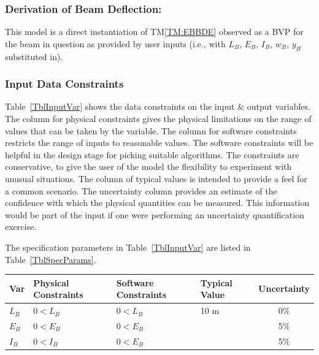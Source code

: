 \documentclass[12pt]{article}
\newcommand{\tref}[1]{TM\ref{#1}}
\begin{document}
\subsubsection*{Derivation of Beam Deflection:}

This model is a direct instantiation of \tref{TM:EBBDE} observed as a BVP for
the beam in question as provided by user inputs (i.e., with $L_B$, $E_B$, $I_B$,
$w_B$, $y_B$ substituted in).

\subsubsection{Input Data Constraints}
\label{sec_DataConstraints}

Table~\ref{TblInputVar} shows the data constraints on the input \& output
variables.  The column for physical constraints gives the physical limitations
on the range of values that can be taken by the variable.  The column for
software constraints restricts the range of inputs to reasonable values.  The
software constraints will be helpful in the design stage for picking suitable
algorithms.  The constraints are conservative, to give the user of the model the
flexibility to experiment with unusual situations.  The column of typical values
is intended to provide a feel for a common scenario.  The uncertainty column
provides an estimate of the confidence with which the physical quantities can be
measured.  This information would be part of the input if one were performing an
uncertainty quantification exercise.

The specification parameters in Table~\ref{TblInputVar} are listed in
Table~\ref{TblSpecParams}.

\begin{table}[!h]
    \caption{Input Variables} \label{TblInputVar}
    \renewcommand{\arraystretch}{1.2}
    \noindent
    \begin{longtable*}{l l l l c}
        \toprule
        \textbf{Var} & \textbf{Physical Constraints} & \textbf{Software Constraints} & \textbf{Typical Value} & \textbf{Uncertainty}\\
        \midrule
        $L_B$        & $0 < L_B$ & $0 < L_B$ & 10 \si[per-mode=symbol]{\metre} & 0\% \\
        $E_B$        & $0 < E_B$ & $0 < E_B$ & \textemdash{} & 5\% \\
        $I_B$        & $0 < I_B$ & $0 < E_B$ & \textemdash{} & 5\% \\
        \bottomrule
    \end{longtable*}
\end{table}
\end{document}
